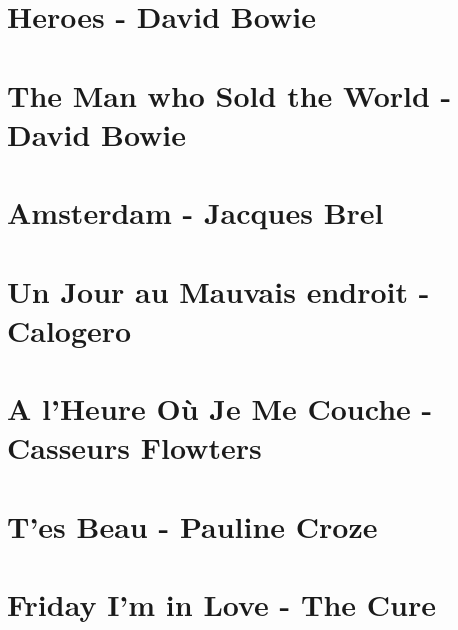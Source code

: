 \documentclass{guitartabs}
\begin{document}
\section*{Heroes - David Bowie}
\begin{guitar}

\end{guitar}

\section*{The Man who Sold the World - David Bowie}
\begin{guitar}

\end{guitar}


\section{Amsterdam - Jacques Brel}
\begin{guitar}

\end{guitar}

\section{Un Jour au Mauvais endroit - Calogero}
\begin{guitar}

\end{guitar}

\section{A l'Heure Où Je Me Couche - Casseurs Flowters}
\begin{guitar}

\end{guitar}

\section{T'es Beau - Pauline Croze}
\begin{guitar}

\end{guitar}


\section{Friday I'm in Love - The Cure}
\begin{guitar}

\end{guitar}
\end{document}
